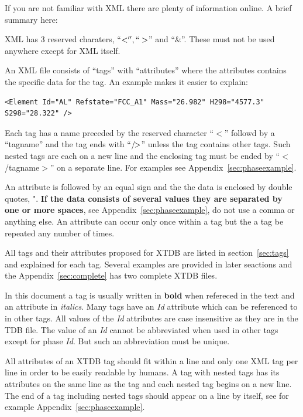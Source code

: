 \documentclass{article}
\newcommand\eoxml{/\hspace{-4pt}>}
\begin{document}
\begin{appendices}
If you are not familiar with XML there are plenty of information
online.  A brief summary here:

XML has 3 reserved charaters, ``$<'', ``>$'' and ``\&''.  These must
not be used anywhere except for XML itself.

An XML file consists of ``tags'' with ``attributes'' where the
attributes contains the specific data for the tag.  An example makes
it easier to explain:

\begin{verbatim}
<Element Id="AL" Refstate="FCC_A1" Mass="26.982" H298="4577.3" S298="28.322" />
\end{verbatim}

Each tag has a name preceded by the reserved character ``$<$'' followd
by a ``tagname'' and the tag ends with ``$\eoxml$'' unless the tag
contains other tags.  Such nested tags are each on a new line and the
enclosing tag must be ended by ``$<$/tagname$>$'' on a separate
line.  For examples see Appendix~\ref{sec:phaseexample}.

An attribute is followed by an equal sign and the the data is enclosed
by double quotes, ".  {\bf If the data consists of several values they
  are separated by one or more spaces}, see
Appendix~\ref{sec:phaseexample}, do not use a comma or anything else.
An attribute can occur only once within a tag but the a tag be
repeated any number of times.

All tags and their attributes proposed for XTDB are listed in
section~\ref{sec:tags} and explained for each tag.  Several examples
are provided in later seactions and the Appendix~\ref{sec:complete}
has two complete XTDB files.

In this document a tag is usually written in {\bf bold} when refereced
in the text and an attribute in {\em italics}.  Many tags have an {\em
  Id} attribute which can be referenced to in other tags.  All values
of the {\em Id} attributes are case insensitive as they are in the TDB
file.  The value of an {\em Id} cannot be abbreviated when used in
other tags except for phase {\em Id}.  But such an abbreviation must
be unique.

All attributes of an XTDB tag should fit within a line and only one
XML tag per line in order to be easily readable by humans.  A tag with
nested tags has its attributes on the same line as the tag and each
nested tag begins on a new line.  The end of a tag including nested
tags should appear on a line by itself, see for example
Appendix~\ref{sec:phaseexample}.


\end{appendices}
\end{document}
